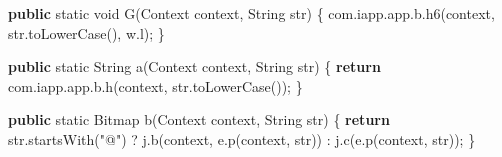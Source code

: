 \documentclass[
]{article}
\newenvironment{Shaded}{}{}
\newcommand{\BuiltInTok}[1]{\textcolor[rgb]{0.00,0.50,0.00}{#1}}
\newcommand{\ControlFlowTok}[1]{\textcolor[rgb]{0.00,0.44,0.13}{\textbf{#1}}}
\newcommand{\DataTypeTok}[1]{\textcolor[rgb]{0.56,0.13,0.00}{#1}}
\newcommand{\FunctionTok}[1]{\textcolor[rgb]{0.02,0.16,0.49}{#1}}
\newcommand{\KeywordTok}[1]{\textcolor[rgb]{0.00,0.44,0.13}{\textbf{#1}}}
\newcommand{\NormalTok}[1]{#1}
\newcommand{\OperatorTok}[1]{\textcolor[rgb]{0.40,0.40,0.40}{#1}}
\newcommand{\StringTok}[1]{\textcolor[rgb]{0.25,0.44,0.63}{#1}}
\begin{document}
\begin{Shaded}
\begin{Highlighting}[]
    \KeywordTok{public} \DataTypeTok{static} \DataTypeTok{void} \FunctionTok{G}\OperatorTok{(}\BuiltInTok{Context}\NormalTok{ context}\OperatorTok{,} \BuiltInTok{String}\NormalTok{ str}\OperatorTok{)} \OperatorTok{\{}
\NormalTok{        com}\OperatorTok{.}\FunctionTok{iapp}\OperatorTok{.}\FunctionTok{app}\OperatorTok{.}\FunctionTok{b}\OperatorTok{.}\FunctionTok{h6}\OperatorTok{(}\NormalTok{context}\OperatorTok{,}\NormalTok{ str}\OperatorTok{.}\FunctionTok{toLowerCase}\OperatorTok{(),}\NormalTok{ w}\OperatorTok{.}\FunctionTok{l}\OperatorTok{);}
    \OperatorTok{\}}

    \KeywordTok{public} \DataTypeTok{static} \BuiltInTok{String} \FunctionTok{a}\OperatorTok{(}\BuiltInTok{Context}\NormalTok{ context}\OperatorTok{,} \BuiltInTok{String}\NormalTok{ str}\OperatorTok{)} \OperatorTok{\{}
        \ControlFlowTok{return}\NormalTok{ com}\OperatorTok{.}\FunctionTok{iapp}\OperatorTok{.}\FunctionTok{app}\OperatorTok{.}\FunctionTok{b}\OperatorTok{.}\FunctionTok{h}\OperatorTok{(}\NormalTok{context}\OperatorTok{,}\NormalTok{ str}\OperatorTok{.}\FunctionTok{toLowerCase}\OperatorTok{());}
    \OperatorTok{\}}

    \KeywordTok{public} \DataTypeTok{static}\NormalTok{ Bitmap }\FunctionTok{b}\OperatorTok{(}\BuiltInTok{Context}\NormalTok{ context}\OperatorTok{,} \BuiltInTok{String}\NormalTok{ str}\OperatorTok{)} \OperatorTok{\{}
        \ControlFlowTok{return}\NormalTok{ str}\OperatorTok{.}\FunctionTok{startsWith}\OperatorTok{(}\StringTok{"@"}\OperatorTok{)} \OperatorTok{?}\NormalTok{ j}\OperatorTok{.}\FunctionTok{b}\OperatorTok{(}\NormalTok{context}\OperatorTok{,}\NormalTok{ e}\OperatorTok{.}\FunctionTok{p}\OperatorTok{(}\NormalTok{context}\OperatorTok{,}\NormalTok{ str}\OperatorTok{))} \OperatorTok{:}\NormalTok{ j}\OperatorTok{.}\FunctionTok{c}\OperatorTok{(}\NormalTok{e}\OperatorTok{.}\FunctionTok{p}\OperatorTok{(}\NormalTok{context}\OperatorTok{,}\NormalTok{ str}\OperatorTok{));}
    \OperatorTok{\}}


\end{Highlighting}
\end{Shaded}
\end{document}
